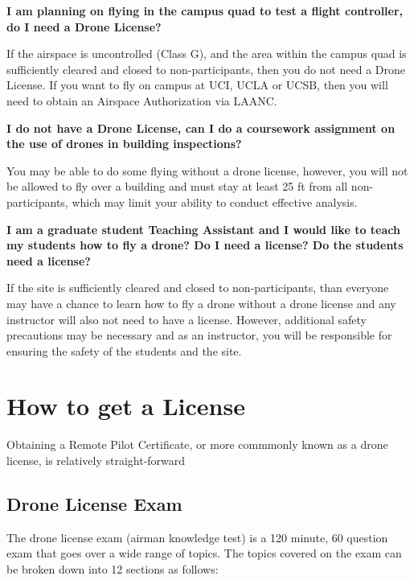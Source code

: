 \documentclass[
]{book}
\begin{document}
\textbf{I am planning on flying in the campus quad to test a flight controller, do I need a Drone License?}

If the airspace is uncontrolled (Class G), and the area within the campus quad is sufficiently cleared and closed to non-participants, then you do not need a Drone License. If you want to fly on campus at UCI, UCLA or UCSB, then you will need to obtain an Airspace Authorization via LAANC.

\textbf{I do not have a Drone License, can I do a coursework assignment on the use of drones in building inspections?}

You may be able to do some flying without a drone license, however, you will not be allowed to fly over a building and must stay at least 25 ft from all non-participants, which may limit your ability to conduct effective analysis.

\textbf{I am a graduate student Teaching Assistant and I would like to teach my students how to fly a drone? Do I need a license? Do the students need a license?}

If the site is sufficiently cleared and closed to non-participants, than everyone may have a chance to learn how to fly a drone without a drone license and any instructor will also not need to have a license. However, additional safety precautions may be necessary and as an instructor, you will be responsible for ensuring the safety of the students and the site.

\hypertarget{ch-get-license}{%
\chapter{How to get a License}\label{ch-get-license}}

Obtaining a Remote Pilot Certificate, or more commmonly known as a drone license, is relatively straight-forward

\hypertarget{drone-license-exam}{%
\section{Drone License Exam}\label{drone-license-exam}}

The drone license exam (airman knowledge test) is a 120 minute, 60 question exam that goes over a wide range of topics. The topics covered on the exam can be broken down into 12 sections as follows:
\end{document}
